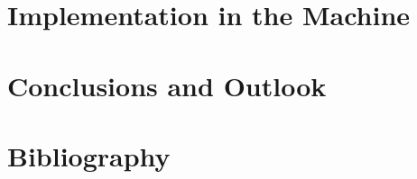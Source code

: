 \documentclass[a4paper, twoside, notitlepage, 10pt]{report}
\begin{document}
\chapter{Implementation in the Machine}\label{ch:implementation}

\chapter{Conclusions and Outlook}\label{ch:conclusion}


\clearpage
\chapter*{Bibliography}

\printbibliography[heading=none]




\begin{appendices}

\renewcommand{\thesection}{\thechapter.\arabic{section}}
\renewcommand\thefigure{\thechapter.\arabic{figure}}
\renewcommand\theequation{\thechapter.\arabic{equation}}
 
\setcounter{equation}{0}
\setcounter{figure}{0}

%


 
\end{appendices}
\end{document}
